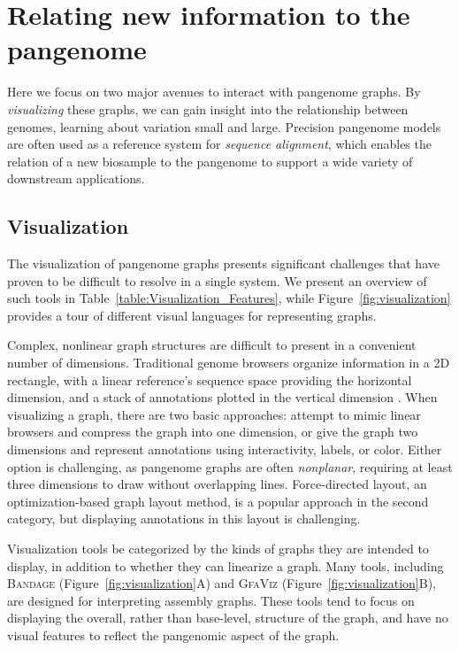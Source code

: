 \section{Relating new information to the pangenome}
\label{sec:relating}

Here we focus on two major avenues to interact with pangenome graphs.
By \emph{visualizing} these graphs, we can gain insight into the relationship between genomes, learning about variation small and large.
Precision pangenome models are often used as a reference system for \emph{sequence alignment}, which enables the relation of a new biosample to the pangenome to support a wide variety of downstream applications.

\subsection{Visualization}

\label{sec:viz}


The visualization of pangenome graphs presents significant challenges that have proven to be difficult to resolve in a single system.
We present an overview of such tools in Table~\ref{table:Visualization_Features}, while Figure~\ref{fig:visualization} provides a tour of different visual languages for representing graphs.

Complex, nonlinear graph structures are difficult to present in a convenient number of dimensions.
Traditional genome browsers organize information in a 2D rectangle, with a linear reference's sequence space providing the horizontal dimension, and a stack of annotations plotted in the vertical dimension \cite{Haeussler_2018}.
When visualizing a graph, there are two basic approaches: attempt to mimic linear browsers and compress the graph into one dimension, or give the graph two dimensions and represent annotations using interactivity, labels, or color.
Either option is challenging, as pangenome graphs are often \emph{nonplanar}, requiring at least three dimensions to draw without overlapping lines.
Force-directed layout, an optimization-based graph layout method, is a popular approach in the second category, but displaying annotations in this layout is challenging.

Visualization tools be categorized by the kinds of graphs they are intended to display, in addition to whether they can linearize a graph.
Many tools, including \textsc{Bandage} \citep{Wick_2015} (Figure~\ref{fig:visualization}A) and \textsc{GfaViz} \cite{Gonnella_2018} (Figure~\ref{fig:visualization}B), are designed for interpreting assembly graphs. 
These tools tend to focus on displaying the overall, rather than base-level, structure of the graph, and have no visual features to reflect the pangenomic aspect of the graph.


